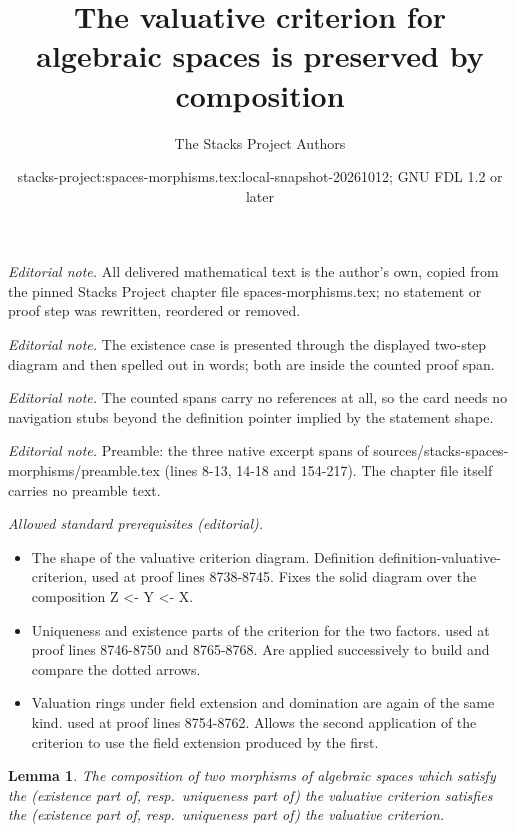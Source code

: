 \documentclass[10pt,a4paper]{amsart}
\title{The valuative criterion for algebraic spaces is preserved by composition}
\author{The Stacks Project Authors}
\date{stacks-project:spaces-morphisms.tex:local-snapshot-20261012; GNU FDL 1.2 or later}
\theoremstyle{plain}
\newtheorem{lemma}[subsection]{Lemma}
\theoremstyle{definition}
\theoremstyle{remark}
\numberwithin{equation}{subsection}
\begin{document}
\maketitle
\setcounter{subsection}{1}
\noindent\textit{Editorial note.} All delivered mathematical text is the author's own, copied from the pinned Stacks Project chapter file spaces-morphisms.tex; no statement or proof step was rewritten, reordered or removed.\par\medskip
\noindent\textit{Editorial note.} The existence case is presented through the displayed two-step diagram and then spelled out in words; both are inside the counted proof span.\par\medskip
\noindent\textit{Editorial note.} The counted spans carry no references at all, so the card needs no navigation stubs beyond the definition pointer implied by the statement shape.\par\medskip
\noindent\textit{Editorial note.} Preamble: the three native excerpt spans of sources/stacks-spaces-morphisms/preamble.tex (lines 8-13, 14-18 and 154-217). The chapter file itself carries no preamble text.\par\medskip
\noindent\textit{Allowed standard prerequisites (editorial).}\begin{itemize}
\item The shape of the valuative criterion diagram. Definition definition-valuative-criterion, used at proof lines 8738-8745. Fixes the solid diagram over the composition Z <- Y <- X.
\item Uniqueness and existence parts of the criterion for the two factors. used at proof lines 8746-8750 and 8765-8768. Are applied successively to build and compare the dotted arrows.
\item Valuation rings under field extension and domination are again of the same kind. used at proof lines 8754-8762. Allows the second application of the criterion to use the field extension produced by the first.
\end{itemize}\medskip
\begin{lemma}
\label{lemma-composition-valuative-criteria}
The composition of two morphisms of algebraic spaces which satisfy the
(existence part of, resp.\ uniqueness part of) the valuative criterion
satisfies the (existence part of, resp.\ uniqueness part of) the valuative
criterion.
\end{lemma}
\end{document}
